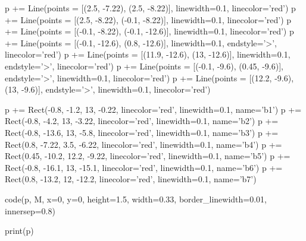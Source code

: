 \begin{python}
p += Line(points = [(2.5, -7.22), (2.5, -8.22)], linewidth=0.1, linecolor='red')
p += Line(points = [(2.5, -8.22), (-0.1, -8.22)], linewidth=0.1, linecolor='red')
p += Line(points = [(-0.1, -8.22), (-0.1, -12.6)], linewidth=0.1, linecolor='red')
p += Line(points = [(-0.1, -12.6), (0.8, -12.6)], linewidth=0.1, endstyle='>', linecolor='red')
p += Line(points = [(11.9, -12.6), (13, -12.6)], linewidth=0.1, endstyle='>', linecolor='red')
p += Line(points = [(-0.1, -9.6), (0.45, -9.6)], endstyle='>', linewidth=0.1, linecolor='red')
p += Line(points = [(12.2, -9.6), (13, -9.6)], endstyle='>', linewidth=0.1, linecolor='red')

p += Rect(-0.8, -1.2, 13, -0.22, linecolor='red', linewidth=0.1, name='b1')
p += Rect(-0.8, -4.2, 13, -3.22, linecolor='red', linewidth=0.1, name='b2')
p += Rect(-0.8, -13.6, 13, -5.8, linecolor='red', linewidth=0.1, name='b3')
p += Rect(0.8, -7.22, 3.5, -6.22, linecolor='red', linewidth=0.1, name='b4')
p += Rect(0.45, -10.2, 12.2, -9.22, linecolor='red', linewidth=0.1, name='b5')
p += Rect(-0.8, -16.1, 13, -15.1, linecolor='red', linewidth=0.1, name='b6')
p += Rect(0.8, -13.2, 12, -12.2, linecolor='red', linewidth=0.1, name='b7') 

code(p, M, x=0, y=0, height=1.5, width=0.33, border_linewidth=0.01, innersep=0.8)

print(p)
\end{python}
